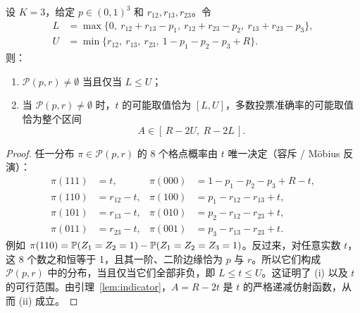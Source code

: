 \documentclass[11pt]{article}
\begin{document}
\begin{theorem}[$K=3$ 的一般闭式解]\label{thm:k3general}
设 $K=3$，给定 $p\in(0,1)^3$ 和 $r_{12},r_{13},r_{23}$。令
\begin{align*}
L&=\max\{0,\ r_{12}+r_{13}-p_1,\ r_{12}+r_{23}-p_2,\ r_{13}+r_{23}-p_3\},\\
U&=\min\{r_{12},\ r_{13},\ r_{23},\ 1-p_1-p_2-p_3+R\}.
\end{align*}
则：
\begin{enumerate}[label=(\roman*)]
\item $\mathcal P(p,r)\neq\emptyset$ 当且仅当 $L\le U$；
\item 当 $\mathcal P(p,r)\neq\emptyset$ 时，$t$ 的可能取值恰为 $[L,U]$，多数投票准确率的可能取值恰为整个区间
\[
\boxed{\ A\in[\,R-2U,\ R-2L\,].\ }
\]
\end{enumerate}
\end{theorem}
\begin{proof}
任一分布 $\pi\in\mathcal P(p,r)$ 的 8 个格点概率由 $t$ 唯一决定（容斥 / Möbius 反演）：
\begin{align*}
\pi(111)&=t, & \pi(000)&=1-p_1-p_2-p_3+R-t,\\
\pi(110)&=r_{12}-t, & \pi(100)&=p_1-r_{12}-r_{13}+t,\\
\pi(101)&=r_{13}-t, & \pi(010)&=p_2-r_{12}-r_{23}+t,\\
\pi(011)&=r_{23}-t, & \pi(001)&=p_3-r_{13}-r_{23}+t.
\end{align*}
例如 $\pi(110)=\mathbb{P}(Z_1=Z_2=1)-\mathbb{P}(Z_1=Z_2=Z_3=1)$。反过来，对任意实数 $t$，这 8 个数之和恒等于 1，且其一阶、二阶边缘恰为 $p$ 与 $r$。所以它们构成 $\mathcal P(p,r)$ 中的分布，当且仅当它们全部非负，即 $L\le t\le U$。这证明了 (i) 以及 $t$ 的可行范围。由引理~\ref{lem:indicator}，$A=R-2t$ 是 $t$ 的严格递减仿射函数，从而 (ii) 成立。
\end{proof}
\end{document}
